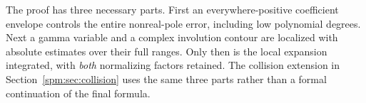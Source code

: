 The proof has three necessary parts. First an everywhere-positive coefficient envelope controls the entire nonreal-pole error, including low polynomial degrees. Next a gamma variable and a complex involution contour are localized with absolute estimates over their full ranges. Only then is the local expansion integrated, with \emph{both} normalizing factors retained. The collision extension in Section~\ref{spm:sec:collision} uses the same three parts rather than a formal continuation of the final formula.
